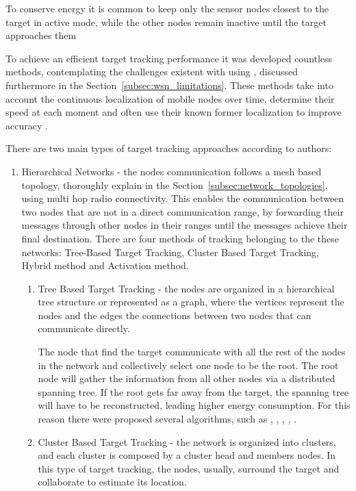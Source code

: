 To conserve energy it is common to keep only the sensor nodes closest to the target in active
mode, while the other nodes remain inactive until the target approaches them

To achieve an efficient target tracking performance it was developed countless methods,
contemplating the challenges existent with using , discussed furthermore in
the Section~\ref{subsec:wsn_limitations}. These methods take into account the continuous
localization of mobile nodes over time, determine their speed at each moment and often use
their known former localization to improve accuracy \cite{Kumar2017}.

There are two main types of target tracking approaches according to \cite{Ramya2012} authors:
\begin{enumerate}
      \item Hierarchical Networks - the nodes communication follows a mesh based topology,
            thoroughly explain in the Section~\ref{subsec:network_topologies}, using multi hop
            radio connectivity. This enables the communication between two nodes that are not
            in a direct communication range, by forwarding their messages through other nodes
            in their ranges until the messages achieve their final destination. There are four
            methods of tracking belonging to the these networks: Tree-Based Target Tracking,
            Cluster Based Target Tracking, Hybrid method and Activation method.
            \begin{enumerate}
                  \item Tree Based Target Tracking - the nodes are organized in a hierarchical
                        tree structure or represented as a graph, where the vertices represent
                        the nodes and the edges the connections between two nodes that can
                        communicate directly.

                        The node that find the target communicate with all the rest of the
                        nodes in the network and collectively select one node to be the root.
                        The root node will gather the information from all other nodes via a
                        distributed spanning tree. If the root gets far away from the target,
                        the spanning tree will have to be reconstructed, leading higher energy
                        consumption. For this reason there were proposed several algorithms,
                        such as  \cite{Kung2003},  \cite{Zhang2004},
                         \cite{Lin2006},  \cite{Tsai2007}, 
                        \cite{Tran2006}.
                  \item Cluster Based Target Tracking - the network is organized into clusters,
                        and each cluster is composed by a cluster head and members nodes.
                        In this type of target tracking, the nodes, usually, surround the target
                        and collaborate to estimate its location.


\end{enumerate}
\end{enumerate}
